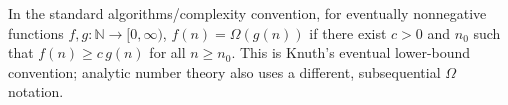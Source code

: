 
In the standard algorithms/complexity convention, for eventually nonnegative functions $f,g:\mathbb N\to[0,\infty)$, $f(n)=\Omega(g(n))$ if there exist $c>0$ and $n_0$ such that $f(n)\ge c\,g(n)$ for all $n\ge n_0$. This is Knuth's eventual lower-bound convention; analytic number theory also uses a different, subsequential $\Omega$ notation.
